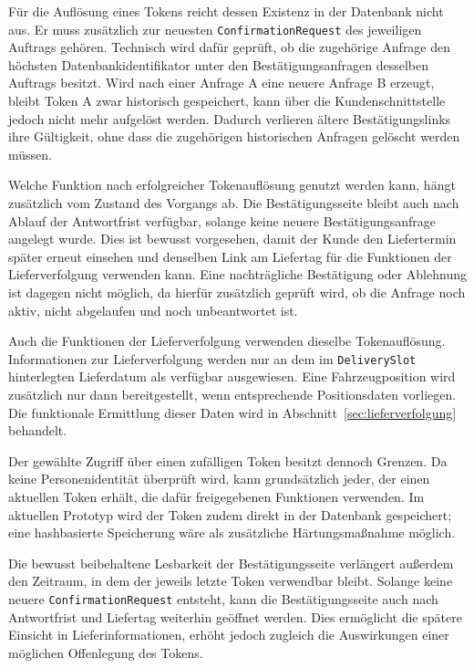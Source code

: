 Für die Auflösung eines Tokens reicht dessen Existenz in der Datenbank nicht
aus. Er muss zusätzlich zur neuesten \texttt{ConfirmationRequest} des
jeweiligen Auftrags gehören. Technisch wird dafür geprüft, ob die zugehörige
Anfrage den höchsten Datenbankidentifikator unter den Bestätigungsanfragen
desselben Auftrags besitzt. Wird nach einer Anfrage A eine neuere Anfrage B
erzeugt, bleibt Token A zwar historisch gespeichert, kann über die
Kundenschnittstelle jedoch nicht mehr aufgelöst werden. Dadurch verlieren
ältere Bestätigungslinks ihre Gültigkeit, ohne dass die zugehörigen historischen
Anfragen gelöscht werden müssen.

Welche Funktion nach erfolgreicher Tokenauflösung genutzt werden kann, hängt
zusätzlich vom Zustand des Vorgangs ab. Die Bestätigungsseite bleibt auch
nach Ablauf der Antwortfrist verfügbar, solange keine neuere
Bestätigungsanfrage angelegt wurde. Dies ist bewusst vorgesehen, damit der
Kunde den Liefertermin später erneut einsehen und denselben Link am Liefertag
für die Funktionen der Lieferverfolgung verwenden kann. Eine nachträgliche
Bestätigung oder Ablehnung ist dagegen nicht möglich, da hierfür zusätzlich
geprüft wird, ob die Anfrage noch aktiv, nicht abgelaufen und noch unbeantwortet
ist.

Auch die Funktionen der Lieferverfolgung verwenden dieselbe Tokenauflösung.
Informationen zur Lieferverfolgung werden nur an dem im
\texttt{DeliverySlot} hinterlegten Lieferdatum als verfügbar ausgewiesen. Eine
Fahrzeugposition wird zusätzlich nur dann bereitgestellt, wenn entsprechende
Positionsdaten vorliegen. Die funktionale Ermittlung dieser Daten wird in
Abschnitt~\ref{sec:lieferverfolgung} behandelt.

Der gewählte Zugriff über einen zufälligen Token besitzt dennoch Grenzen. Da
keine Personenidentität überprüft wird, kann grundsätzlich jeder, der einen
aktuellen Token erhält, die dafür freigegebenen Funktionen verwenden. Im
aktuellen Prototyp wird der Token zudem direkt in der Datenbank gespeichert;
eine hashbasierte Speicherung wäre als zusätzliche Härtungsmaßnahme möglich.

Die bewusst beibehaltene Lesbarkeit der Bestätigungsseite verlängert
außerdem den Zeitraum, in dem der jeweils letzte Token verwendbar bleibt.
Solange keine neuere \texttt{ConfirmationRequest} entsteht, kann die
Bestätigungsseite auch nach Antwortfrist und Liefertag weiterhin geöffnet
werden. Dies ermöglicht die spätere Einsicht in Lieferinformationen, erhöht
jedoch zugleich die Auswirkungen einer möglichen Offenlegung des Tokens.

